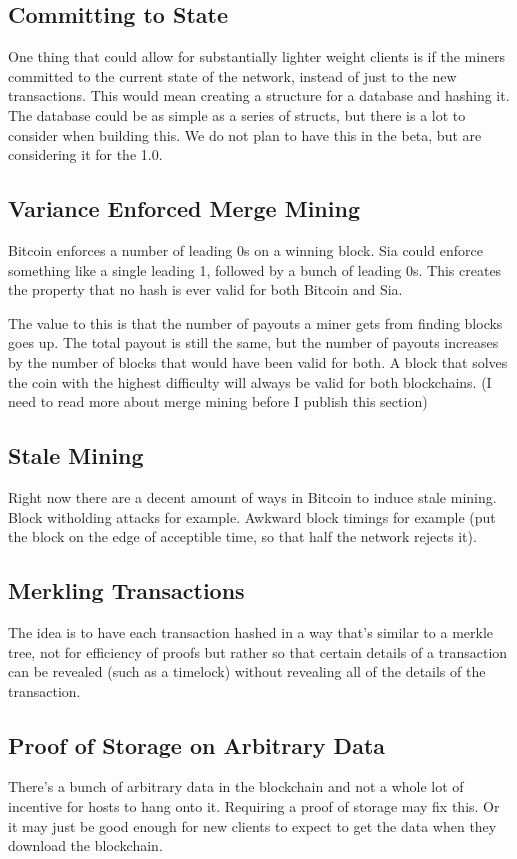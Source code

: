 \documentclass[twocolumn]{article}
\begin{document}
\subsection{Committing to State}
One thing that could allow for substantially lighter weight clients is if the miners committed to the current state of the network, instead of just to the new transactions.
This would mean creating a structure for a database and hashing it.
The database could be as simple as a series of structs, but there is a lot to consider when building this.
We do not plan to have this in the beta, but are considering it for the 1.0.

\subsection{Variance Enforced Merge Mining}
Bitcoin enforces a number of leading 0s on a winning block.
Sia could enforce something like a single leading 1, followed by a bunch of leading 0s.
This creates the property that no hash is ever valid for both Bitcoin and Sia.

The value to this is that the number of payouts a miner gets from finding blocks goes up.
The total payout is still the same, but the number of payouts increases by the number of blocks that would have been valid for both.
A block that solves the coin with the highest difficulty will always be valid for both blockchains.
(I need to read more about merge mining before I publish this section)

\subsection{Stale Mining}
Right now there are a decent amount of ways in Bitcoin to induce stale mining.
Block witholding attacks for example.
Awkward block timings for example (put the block on the edge of acceptible time, so that half the network rejects it).

\subsection{Merkling Transactions}
The idea is to have each transaction hashed in a way that's similar to a merkle tree, not for efficiency of proofs but rather so that certain details of a transaction can be revealed (such as a timelock) without revealing all of the details of the transaction.

\subsection{Proof of Storage on Arbitrary Data}
There's a bunch of arbitrary data in the blockchain and not a whole lot of incentive for hosts to hang onto it.
Requiring a proof of storage may fix this.
Or it may just be good enough for new clients to expect to get the data when they download the blockchain.
\end{document}
